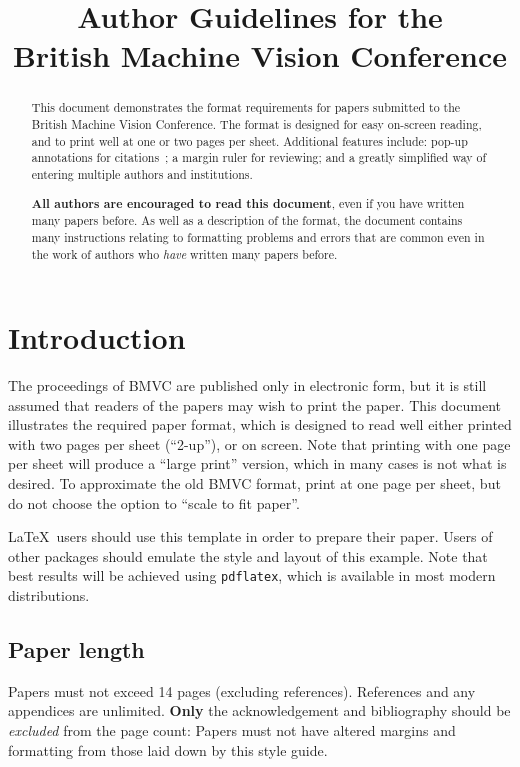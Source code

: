 \documentclass{bmvc2k}
\title{Author Guidelines for the\\ British Machine Vision Conference}
\begin{document}
\maketitle

\begin{abstract}
This document demonstrates the format requirements for papers submitted
to the British Machine Vision Conference.  The format is designed for
easy on-screen reading, and to print well at one or two pages per sheet.
Additional features include: pop-up annotations for
citations~\cite{Authors06,Mermin89}; a margin ruler for reviewing; and a
greatly simplified way of entering multiple authors and institutions.

{\bf All authors are encouraged to read this document}, even if you have
written many papers before.  As well as a description of the format, the
document contains many instructions relating to formatting problems and
errors that are common even in the work of authors who {\em have}
written many papers before.
\end{abstract}

\section{Introduction}
\label{sec:intro}
The proceedings of BMVC are published only in electronic form, but it is still assumed
that readers of the papers may wish to print the paper.   This document
illustrates the required paper format, which is designed to read well either printed
with two pages per sheet (``2-up''), or on screen.  Note that printing with one page
per sheet will produce a ``large print'' version, which in many cases is not what is desired.
To approximate the old BMVC format, print at one page per sheet, but do not choose
the option to ``scale to fit paper''.

\LaTeX\ users should use this template in order to prepare their paper.
Users of other packages should emulate the style and layout of this
example.  Note that best results will be achieved using {\tt pdflatex},
which is available in most modern distributions.

\subsection{Paper length}
Papers must not exceed 14 pages (excluding references). References and any appendices are unlimited.
{\bf Only}  the acknowledgement and bibliography should be {\em excluded} from the page count: Papers must not have altered margins and formatting from those laid down by this style guide.
\end{document}
